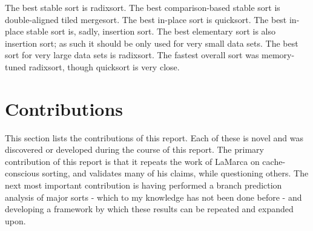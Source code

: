 
The best stable sort is radixsort. The best comparison-based stable sort is
double-aligned tiled mergesort. The best in-place sort is quicksort. The best in-place
stable sort is, sadly, insertion sort. The best elementary sort is also
insertion sort; as such it should be only used for very small data sets.  The
best sort for very large data sets is radixsort. The fastest overall sort was
memory-tuned radixsort, though quicksort is very close.

\section{Contributions}

This section lists the contributions of this report. Each of these is novel  
and was discovered or developed during the course of this report.
The primary contribution of this report is that it repeats the work of LaMarca
on cache-conscious sorting, and validates many of his claims, while questioning
others. The next most important contribution is having performed a branch
prediction analysis of major sorts - which to my knowledge has not been done
before - and developing a framework by which these results can be repeated and
expanded upon.

